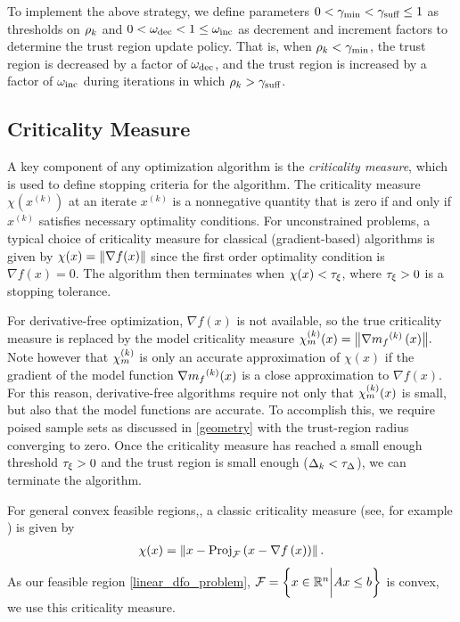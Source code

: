 \documentclass{article}
\begin{document}
To implement the above strategy,  we define parameters
$
0 < \gamma_{\textrm{min}} < \gamma_{\textrm{suff}} \le 1
$
as thresholds on $\rho_k$ and
$
0 < \omega_{\text{dec}} < 1 \le \omega_{\text{inc}}
$
as decrement and increment factors to determine the trust region update policy.
That is, when $\rho_k < \gamma_{\textrm{min}}$, the trust region is decreased by a factor of $\omega_{\text{dec}}$, and the trust region is increased by a factor of $\omega_{\text{inc}}$
during iterations in which $\rho_k > \gamma_{\textrm{suff}}$.



\subsection{Criticality Measure}

\label{criticality_measure_section}

A key component of any optimization algorithm is the {\em criticality measure}, which is used to define stopping criteria for the algorithm.
The criticality measure $\chi(x^{(k)})$ at an iterate $x^{(k)}$ is a nonnegative quantity that is zero if and only if $x^{(k)}$ satisfies necessary optimality conditions.
For unconstrained problems,  a typical choice of criticality measure for classical (gradient-based) algorithms is given by $\chi(x) = {\left\|\nabla f(x)\right\|}$
since the first order optimality condition is $\nabla f(x)=0$.
The algorithm then terminates when $\chi(x) < \tau_{\xi}$, where $\tau_{\xi} >0$ is a stopping tolerance.

For derivative-free optimization,  $\nabla f(x)$ is not available,  so the true criticality measure is replaced by the model criticality measure
${\chi_m^{(k)}}(x) = {\left\|\nabla {{m}_f}^{(k)}\left(x\right)\right\|}.$
Note however that ${\chi_m^{(k)}}$ is only an accurate approximation of $\chi(x)$ if the gradient of the model function $\nabla {{m}_f}^{(k)}(x)$ is a close approximation to $\nabla f(x)$.
For this reason, derivative-free algorithms require not only that ${\chi_m^{(k)}}(x)$ is small, but also that the model functions are accurate.
To accomplish this, we require poised sample sets as discussed in \cref{geometry} with the trust-region radius converging to zero.
Once the criticality measure has reached a small enough threshold $\tau_{\xi} > 0$ and the trust region is small enough ($\Delta_k < \tau_{\Delta}$),
we can terminate the algorithm.




For general convex feasible regions,,
a classic criticality measure (see, for example \cite{Conejo:2013:GCT:2620806.2621814} \cite{Conn:2000:TM:357813}) is given by
\begin{align*}
\chi(x) = \left\|x - {\textrm{Proj}}_{{\mathcal F}}\left(x- \nabla f\left(x\right)\right)\right\|.
\end{align*}
As our feasible region \cref{linear_dfo_problem},
${\mathcal F} = \left\{ x \in \mathbb R^n \bigg | Ax \le b \right\}$
is convex, we use this criticality measure.
\end{document}
